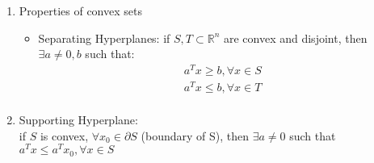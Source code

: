 \documentclass[12pt,letter]{article}
\newcommand{\R}{\mathbb{R}}
\begin{document}
\begin{enumerate}
  \pagebreak
  
\item Properties of convex sets
  \begin{itemize}
  \item Separating Hyperplanes: if $S,T \subset \R^n$ are convex and disjoint, then $\exists a \neq 0, b$ such that:\\
    \begin{align*}
      a^Tx \geq b, \forall x \in S\\
      a^Tx \leq b, \forall x \in T\\
    \end{align*}
  \end{itemize}
\item Supporting Hyperplane:\\
  if $S$ is convex, $\forall x_0 \in \partial S$ (boundary of S), then $\exists a \neq 0$ such that $a^Tx \leq a^Tx_0, \forall x \in S$\\
\end{enumerate}
\end{document}
